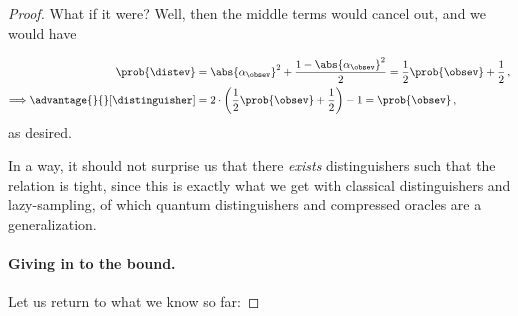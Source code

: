 \begin{proof}
        What if it were? Well, then the middle terms would cancel out, and we would have

        \begin{align*}
          \prob{\distev} &= \abs{\alpha_\obsev}^2 + \frac{1 -
          \abs{\alpha_\obsev}^2}{2}
            = \frac{1}{2} \prob{\obsev} + \frac{1}{2}\, , \\
          \Longrightarrow \advantage{}{}[\distinguisher] &= 
            2 \cdot \left( \frac{1}{2} \prob{\obsev} + \frac{1}{2}\right) - 1 
            = \prob{\obsev}\, ,
        \end{align*}
        as desired. 


        In a way, it should not surprise us that there \emph{exists}
          distinguishers such that the relation is tight, since this is exactly
          what we get with classical distinguishers and lazy-sampling, of which
          quantum distinguishers and compressed oracles are a generalization.


      \paragraph{Giving in to the bound.}
        Let us return to what we know so far:


\end{proof}
